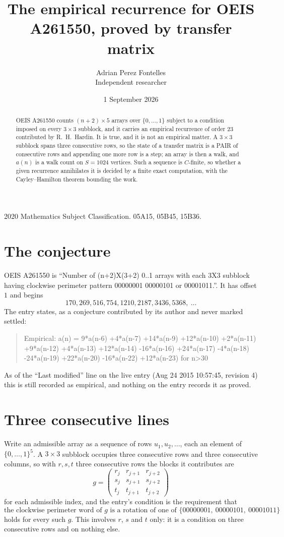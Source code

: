 \documentclass[11pt,a4paper]{article}
\title{The empirical recurrence for OEIS A261550, proved by transfer matrix}
\author{Adrian Perez Fontelles\\ \small Independent researcher}
\date{1 September 2026}
\theoremstyle{plain}
\theoremstyle{definition}
\begin{document}
\maketitle

\begin{abstract}
OEIS A261550 counts $(n+2)\times5$ arrays over $\{0,\dots,1\}$ subject to a condition imposed on
every $3\times3$ subblock, and it carries an empirical recurrence of order $23$
contributed by R.~H.~Hardin. It is true, and it is not an empirical matter. A $3\times3$
subblock spans three consecutive rows, so the state of a transfer matrix is a PAIR of
consecutive rows and appending one more row is a step; an array is then a walk, and
$a(n)$ is a walk count on $S=1024$ vertices. Such a sequence is $C$-finite, so whether a given
recurrence annihilates it is decided by a finite exact computation, with the Cayley--Hamilton
theorem bounding the work.
\end{abstract}

\noindent\small 2020 Mathematics Subject Classification. 05A15, 05B45, 15B36.\normalsize

\section{The conjecture}

OEIS A261550 is ``Number of (n+2)X(3+2) 0..1 arrays with each 3X3 subblock having clockwise perimeter pattern 00000001 00000101 or 00001011.''. It has offset $1$ and begins
\[
170, 269, 516, 754, 1210, 2187, 3436, 5368,\ \dots
\]
The entry states, as a conjecture contributed by its author and never marked settled:
\begin{quote}
Empirical: a(n) = 9*a(n-6) +4*a(n-7) +14*a(n-9) +12*a(n-10) +2*a(n-11) +9*a(n-12) +4*a(n-13) +12*a(n-14) -16*a(n-16) +24*a(n-17) -4*a(n-18) -24*a(n-19) +22*a(n-20) -16*a(n-22) +12*a(n-23) for n>30
\end{quote}
As of the ``Last modified'' line on the live entry (Aug 24 2015 10:57:45, revision 4) this is still
recorded as empirical, and nothing on the entry records it as proved.

\section{Three consecutive lines}

Write an admissible array as a sequence of rows $u_1,u_2,\dots$, each an element of
$\{0,\dots,1\}^{5}$. A $3\times3$ subblock occupies three consecutive rows and
three consecutive columns, so with $r,s,t$ three consecutive rows the blocks it
contributes are
\[
g=\begin{pmatrix}r_j&r_{j+1}&r_{j+2}\\ s_j&s_{j+1}&s_{j+2}\\ t_j&t_{j+1}&t_{j+2}\end{pmatrix}
\]
for each admissible index, and the entry's condition is the requirement that
\[
\text{the clockwise perimeter word of }g\text{ is a rotation of one of }\{00000001,\ 00000101,\ 00001011\}
\]
holds for every such $g$. This involves $r$, $s$ and $t$ only: it is a condition on
three consecutive rows and on nothing else.
\end{document}
